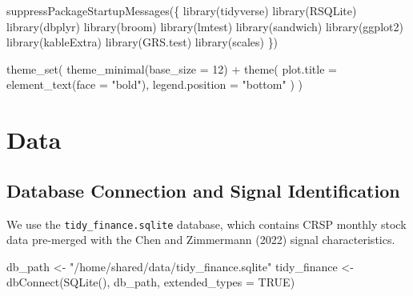 \documentclass[
  letterpaper,
  DIV=11,
  numbers=noendperiod]{scrartcl}
\newenvironment{Shaded}{\begin{snugshade}}{\end{snugshade}}
\newcommand{\AttributeTok}[1]{\textcolor[rgb]{0.40,0.45,0.13}{#1}}
\newcommand{\ConstantTok}[1]{\textcolor[rgb]{0.56,0.35,0.01}{#1}}
\newcommand{\DecValTok}[1]{\textcolor[rgb]{0.68,0.00,0.00}{#1}}
\newcommand{\FunctionTok}[1]{\textcolor[rgb]{0.28,0.35,0.67}{#1}}
\newcommand{\NormalTok}[1]{\textcolor[rgb]{0.00,0.23,0.31}{#1}}
\newcommand{\OtherTok}[1]{\textcolor[rgb]{0.00,0.23,0.31}{#1}}
\newcommand{\SpecialCharTok}[1]{\textcolor[rgb]{0.37,0.37,0.37}{#1}}
\newcommand{\StringTok}[1]{\textcolor[rgb]{0.13,0.47,0.30}{#1}}
\begin{document}
\begin{Shaded}
\begin{Highlighting}[]
\FunctionTok{suppressPackageStartupMessages}\NormalTok{(\{}
  \FunctionTok{library}\NormalTok{(tidyverse)}
  \FunctionTok{library}\NormalTok{(RSQLite)}
  \FunctionTok{library}\NormalTok{(dbplyr)}
  \FunctionTok{library}\NormalTok{(broom)}
  \FunctionTok{library}\NormalTok{(lmtest)}
  \FunctionTok{library}\NormalTok{(sandwich)}
  \FunctionTok{library}\NormalTok{(ggplot2)}
  \FunctionTok{library}\NormalTok{(kableExtra)}
  \FunctionTok{library}\NormalTok{(GRS.test)}
  \FunctionTok{library}\NormalTok{(scales)}
\NormalTok{\})}

\FunctionTok{theme\_set}\NormalTok{(}
  \FunctionTok{theme\_minimal}\NormalTok{(}\AttributeTok{base\_size =} \DecValTok{12}\NormalTok{) }\SpecialCharTok{+}
    \FunctionTok{theme}\NormalTok{(}
      \AttributeTok{plot.title =} \FunctionTok{element\_text}\NormalTok{(}\AttributeTok{face =} \StringTok{"bold"}\NormalTok{),}
      \AttributeTok{legend.position =} \StringTok{"bottom"}
\NormalTok{    )}
\NormalTok{)}
\end{Highlighting}
\end{Shaded}

\section{Data}\label{data}

\subsection{Database Connection and Signal
Identification}\label{database-connection-and-signal-identification}

We use the \texttt{tidy\_finance.sqlite} database, which contains CRSP
monthly stock data pre-merged with the Chen and Zimmermann (2022) signal
characteristics.

\begin{Shaded}
\begin{Highlighting}[]
\NormalTok{db\_path }\OtherTok{\textless{}{-}} \StringTok{"/home/shared/data/tidy\_finance.sqlite"}
\NormalTok{tidy\_finance }\OtherTok{\textless{}{-}} \FunctionTok{dbConnect}\NormalTok{(}\FunctionTok{SQLite}\NormalTok{(), db\_path, }\AttributeTok{extended\_types =} \ConstantTok{TRUE}\NormalTok{)}
\end{Highlighting}
\end{Shaded}
\end{document}
